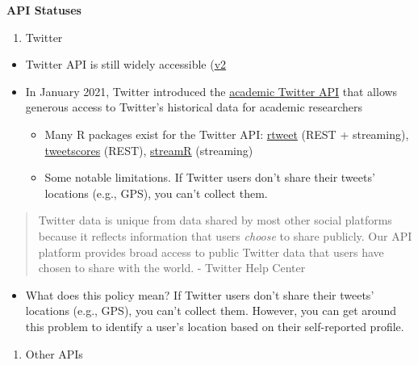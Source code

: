 \documentclass[
]{book}
\providecommand{\tightlist}{%
  \setlength{\itemsep}{0pt}\setlength{\parskip}{0pt}}
\begin{document}
\textbf{API Statuses}

\begin{enumerate}
\def\labelenumi{\arabic{enumi}.}
\tightlist
\item
  Twitter
\end{enumerate}

\begin{itemize}
\item
  Twitter API is still widely accessible (\href{https://developer.twitter.com/en/docs/twitter-api/early-access}{v2}
\item
  In January 2021, Twitter introduced the \href{https://developer.twitter.com/en/solutions/academic-research}{academic Twitter API} that allows generous access to Twitter's historical data for academic researchers

  \begin{itemize}
  \item
    Many R packages exist for the Twitter API: \href{https://cran.r-project.org/web/packages/rtweet/rtweet.pdf}{rtweet} (REST + streaming), \href{https://github.com/pablobarbera/twitter_ideology/tree/master/pkg/tweetscores}{tweetscores} (REST), \href{https://github.com/pablobarbera/streamR}{streamR} (streaming)
  \item
    Some notable limitations. If Twitter users don't share their tweets' locations (e.g., GPS), you can't collect them.
  \end{itemize}
\end{itemize}

\begin{quote}
Twitter data is unique from data shared by most other social platforms because it reflects information that users \emph{choose} to share publicly. Our API platform provides broad access to public Twitter data that users have chosen to share with the world. - Twitter Help Center
\end{quote}

\begin{itemize}
\tightlist
\item
  What does this policy mean? If Twitter users don't share their tweets' locations (e.g., GPS), you can't collect them. However, you can get around this problem to identify a user's location based on their self-reported profile.
\end{itemize}

\begin{enumerate}
\def\labelenumi{\arabic{enumi}.}
\setcounter{enumi}{1}
\tightlist
\item
  Other APIs
\end{enumerate}
\end{document}
